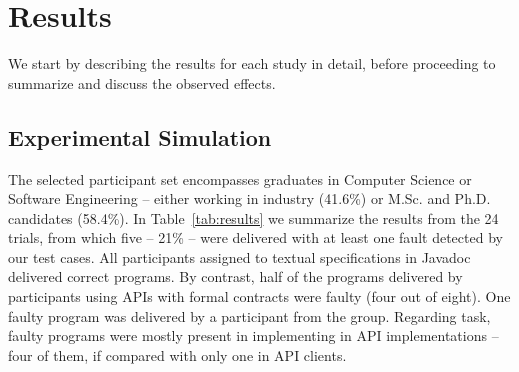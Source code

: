 \section{Results}
\label{results}

We start by describing the results for each study in detail, before proceeding to summarize and discuss the observed effects.

\subsection{Experimental Simulation}
\label{sec:expResults}

The selected participant set encompasses graduates in Computer Science or Software Engineering -- either working in industry (41.6\%) or M.Sc. and Ph.D. candidates (58.4\%).
In Table~\ref{tab:results} we summarize the results from the 24 trials, from which five -- 21\% -- were delivered with at least one fault detected by our test cases.
All participants assigned to textual specifications in Javadoc delivered correct programs.
By contrast, half of the programs delivered by participants using APIs with formal contracts were faulty (four out of eight).
One faulty program was delivered by a participant from the \contractjdoc{} group.
Regarding task, faulty programs were mostly present in implementing in API implementations -- four of them, if compared with only one in API clients.





